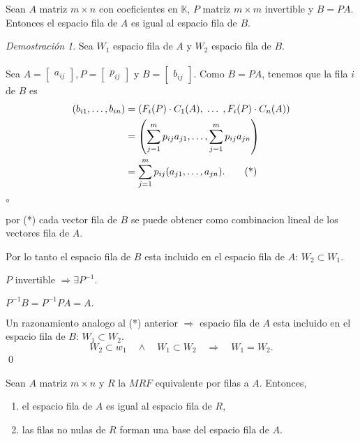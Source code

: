 \documentclass{article}
\theoremstyle{definition}
\theoremstyle{definition}
\theoremstyle{remark}
\newtheorem*{demo}{Demostración}
\begin{document}
\begin{teo}
  Sean $A$ matriz $m \times n$ con coeficientes en $\mathbb{K}$, $P$ matriz $m \times m$ invertible y $B=PA$. Entonces el espacio fila de $A$ es igual al espacio fila de $B$.
\end{teo}
\begin{demo}
  Sea $W_1$ espacio fila de $A$ y $W_2$ espacio fila de $B$. \\\\ Sea $A=\begin{bmatrix}a_{ij}\end{bmatrix}, P=\begin{bmatrix}p_{ij}\end{bmatrix}$ y $B=\begin{bmatrix}b_{ij}\end{bmatrix}$. Como $B=PA$, tenemos que la fila $i$ de $B$ es 
  \begin{align}
    (b_{i1}, \dots ,b_{in}) &= (F_i(P)\cdot C_1 (A),\; \dots \; , F_i(P) \cdot C_n(A)) \notag \\ 
                            &= \left(\sum_{j=1}^{m}p_{ij}a_{j1}, \dots ,\sum_{j=1}^{m}p_{ij}a_{jn} \right) \notag \\
                            &= \sum_{j=1}^{m}p_{ij}(a_{j1},\dots ,a_{jn}). \tag{*}
  \end{align}
\begin{list}{$\circ$}{}  
\item  por (*) cada vector fila de $B$ se puede obtener como combinacion lineal de los vectores fila de $A$. 
\item Por lo tanto el espacio fila de $B$ esta incluido en el espacio fila de $A$: $W_2 \subset W_1$. 
\item $P$ invertible $\Rightarrow \exists P^{-1}$. 
\item $P^{-1}B=P^{-1}PA=A.$ \item Un razonamiento analogo al (*) anterior $\Rightarrow$ espacio fila de $A$ esta incluido en el espacio fila de $B$: $W_1 \subset W_2$. \[
W_2 \subset w_1 \quad \land \quad W_1 \subset W_2 \quad \Rightarrow \quad W_1 = W_2. 
  \]\qed
\end{list}
\end{demo}
\begin{corol}
 Sean $A$ matriz $m \times n$ y $R$ la $MRF$ equivalente por filas a $A$. Entonces, \begin{enumerate}[label=(\arabic*)]
   \item el espacio fila de $A$ es igual al espacio fila de $R$, 
   \item las filas no nulas de $R$ forman una base del espacio fila de $A$.
 \end{enumerate}
\end{corol}
\end{document}
